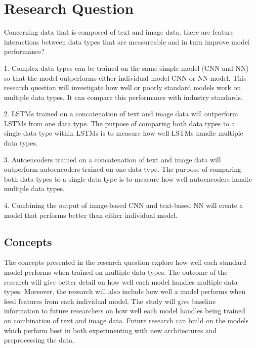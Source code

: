 \chapter{Research Question}


Concerning data that is composed of text and image data, there are feature interactions between data types that are measureable and in turn improve model performance?


1. Complex data types can be trained on the same simple model (CNN and NN) so that the model outperforms either individual model CNN or NN model.  This research question will investigate how well or poorly standard models work on multiple data types. It can compare this performance with industry standards.

2. LSTMs trained on a concatenation of text and image data will outperform LSTMs from one data type.  The purpose of comparing both data types to a single data type within LSTMs is to measure how well LSTMs handle multiple data types.

3. Autoencoders trained on a concatenation of text and image data will outperform autoencoders trained on one data type.  The purpose of comparing both data types to a single data type is to measure how well autoencoders handle multiple data types.

4. Combining the output of image-based CNN and text-based NN will create a model that performs better than either individual model.

\section{Concepts}
The concepts presented in the research question explore how well each standard model performs when trained on multiple data types.  The outcome of the research will give better detail on how well each model handles multiple data types.  Moreover, the research will also include how well a model performs when feed features from each individual model.  The study will give baseline information to future researchers on how well each model handles being trained on combination of text and image data.  Future research can build on the models which perform best in both experimenting with new architectures and preprocessing the data.





